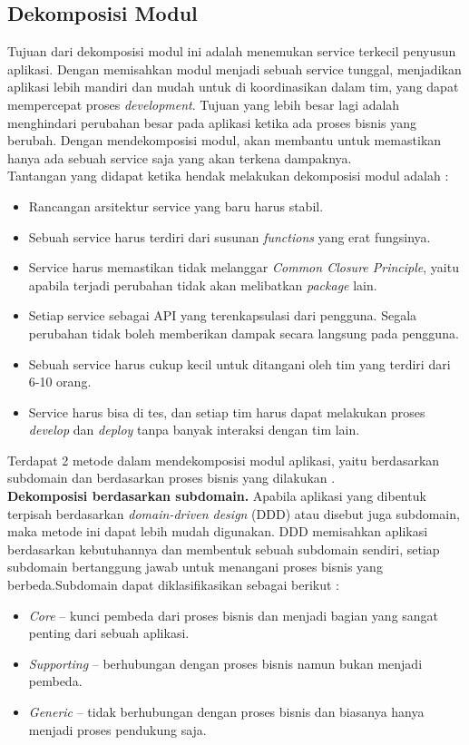 \subsection{Dekomposisi Modul}
Tujuan dari dekomposisi modul ini adalah menemukan service terkecil penyusun aplikasi. Dengan memisahkan modul menjadi sebuah service tunggal, menjadikan aplikasi lebih mandiri dan mudah untuk di koordinasikan dalam tim, yang dapat mempercepat proses \textit{development}. Tujuan yang lebih besar lagi adalah menghindari perubahan besar pada aplikasi ketika ada proses bisnis yang berubah. Dengan mendekomposisi modul, akan membantu untuk memastikan hanya ada sebuah service saja yang akan terkena dampaknya.\\
Tantangan yang didapat ketika hendak melakukan dekomposisi modul adalah :
\begin{itemize}[leftmargin=*]
	\item Rancangan arsitektur service yang baru harus stabil.
	\item Sebuah service harus terdiri dari susunan \textit{functions} yang erat fungsinya.
	\item Service harus memastikan tidak melanggar \textit{Common Closure Principle}, yaitu apabila terjadi perubahan tidak akan melibatkan \textit{package} lain.
	\item Setiap service sebagai API yang terenkapsulasi dari pengguna. Segala perubahan tidak boleh memberikan dampak secara langsung pada pengguna.
	\item Sebuah service harus cukup kecil untuk ditangani oleh tim yang terdiri dari 6-10 orang.
	\item Service harus bisa di tes, dan setiap tim harus dapat melakukan proses \textit{develop} dan \textit{deploy} tanpa banyak interaksi dengan tim lain.
\end{itemize}
Terdapat 2 metode dalam mendekomposisi modul aplikasi, yaitu berdasarkan subdomain dan berdasarkan proses bisnis yang dilakukan \cite{6}.\\
\textbf{Dekomposisi berdasarkan subdomain.} Apabila aplikasi yang dibentuk terpisah berdasarkan \textit{domain-driven design} (DDD) atau disebut juga subdomain, maka metode ini dapat lebih mudah digunakan. DDD memisahkan aplikasi berdasarkan kebutuhannya dan membentuk sebuah subdomain sendiri, setiap subdomain bertanggung jawab untuk menangani proses bisnis yang berbeda.Subdomain dapat diklasifikasikan sebagai berikut :
\begin{itemize}[leftmargin=*]
	\item \textit{Core} – kunci pembeda dari proses bisnis dan menjadi bagian yang sangat penting dari sebuah aplikasi.
	\item \textit{Supporting} – berhubungan dengan proses bisnis namun bukan menjadi pembeda.
	\item \textit{Generic} – tidak berhubungan dengan proses bisnis dan biasanya hanya menjadi proses pendukung saja.
\end{itemize}
